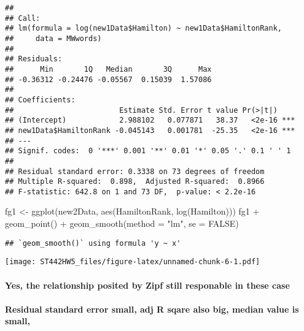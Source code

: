 \documentclass[
]{article}
\newenvironment{Shaded}{\begin{snugshade}}{\end{snugshade}}
\newcommand{\AttributeTok}[1]{\textcolor[rgb]{0.77,0.63,0.00}{#1}}
\newcommand{\ConstantTok}[1]{\textcolor[rgb]{0.00,0.00,0.00}{#1}}
\newcommand{\FunctionTok}[1]{\textcolor[rgb]{0.00,0.00,0.00}{#1}}
\newcommand{\NormalTok}[1]{#1}
\newcommand{\OtherTok}[1]{\textcolor[rgb]{0.56,0.35,0.01}{#1}}
\newcommand{\SpecialCharTok}[1]{\textcolor[rgb]{0.00,0.00,0.00}{#1}}
\newcommand{\StringTok}[1]{\textcolor[rgb]{0.31,0.60,0.02}{#1}}
\begin{document}
\begin{verbatim}
## 
## Call:
## lm(formula = log(new1Data$Hamilton) ~ new1Data$HamiltonRank, 
##     data = MWwords)
## 
## Residuals:
##      Min       1Q   Median       3Q      Max 
## -0.36312 -0.24476 -0.05567  0.15039  1.57086 
## 
## Coefficients:
##                        Estimate Std. Error t value Pr(>|t|)    
## (Intercept)            2.988102   0.077871   38.37   <2e-16 ***
## new1Data$HamiltonRank -0.045143   0.001781  -25.35   <2e-16 ***
## ---
## Signif. codes:  0 '***' 0.001 '**' 0.01 '*' 0.05 '.' 0.1 ' ' 1
## 
## Residual standard error: 0.3338 on 73 degrees of freedom
## Multiple R-squared:  0.898,  Adjusted R-squared:  0.8966 
## F-statistic: 642.8 on 1 and 73 DF,  p-value: < 2.2e-16
\end{verbatim}

\begin{Shaded}
\begin{Highlighting}[]
\NormalTok{fg1 }\OtherTok{\textless{}{-}} \FunctionTok{ggplot}\NormalTok{(new2Data, }\FunctionTok{aes}\NormalTok{(HamiltonRank, }\FunctionTok{log}\NormalTok{(Hamilton))) }
\NormalTok{fg1 }\SpecialCharTok{+} \FunctionTok{geom\_point}\NormalTok{() }\SpecialCharTok{+} \FunctionTok{geom\_smooth}\NormalTok{(}\AttributeTok{method =} \StringTok{"lm"}\NormalTok{, }\AttributeTok{se =} \ConstantTok{FALSE}\NormalTok{)}
\end{Highlighting}
\end{Shaded}

\begin{verbatim}
## `geom_smooth()` using formula 'y ~ x'
\end{verbatim}

\texttt{[image: ST442HW5\_files/figure-latex/unnamed-chunk-6-1.pdf]}

\hypertarget{yes-the-relationship-posited-by-zipf-still-responable-in-these-case}{%
\paragraph{Yes, the relationship posited by Zipf still responable in
these
case}\label{yes-the-relationship-posited-by-zipf-still-responable-in-these-case}}

\hypertarget{residual-standard-error-small-adj-r-sqare-also-big-median-value-is-small}{%
\paragraph{Residual standard error small, adj R sqare also big, median
value is
small,}\label{residual-standard-error-small-adj-r-sqare-also-big-median-value-is-small}}
\end{document}
